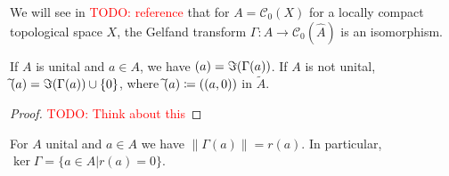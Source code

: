 \documentclass[american]{scrartcl}
\newcommand{\todo}[1]{\textcolor{red}{TODO: #1}}
\renewcommand{\norm}[1]{\left\lVert #1 \right\rVert}
\newcommand{\cC}{\mathcal{C}}
\let\sp\relax
\begin{document}
\begin{example}
	We will see in \todo{reference} that for $A=\cC_0(X)$ for a locally compact topological space $X$, the Gelfand transform $\Gamma\colon A\to \cC_0(\hat{A})$ is an isomorphism.
\end{example}
\begin{proposition}
	If $A$ is unital and $a\in A$, we have $\sp(a)=\Im(\Gamma(a))$. If $A$ is not unital, $\widetilde{\sp}(a)=\Im(\Gamma(a))\cup\{0\}$, where $\widetilde{\sp}(a)\coloneqq \sp{((a,0))}$ in $\tilde{A}$.
\end{proposition}
\begin{proof}
	\todo{Think about this}
\end{proof}
\begin{corollary}
	For $A$ unital and $a\in A$ we have $\norm{\Gamma(a)}=r(a)$. In particular, $\ker \Gamma=\{a\in A|r(a)=0\}$.
\end{corollary}
\end{document}
